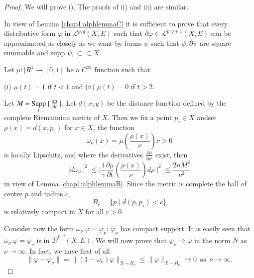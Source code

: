 \begin{proof} 
  We will prove i). The proofs of ii) and iii) are similar. 

  In view of Lemma \ref{chap1:alphlemmaC} it is sufficient to prove
  that every distributive 
  form $\varphi$ in $\mathcal{L}^{p,q}(X,E)$ such that
  ${\overline{\partial}} \varphi \in \mathcal{L}^{p,q+1}(X,E)$ can be
  approximated as closely as we want by forms $\psi$ such that $\psi ,
  {\overline{\partial}} \psi$ are square summable and supp $\psi ,
  \subset \subset X$. 
  
  Let $\mu: \mid R^1 \rightarrow [0,1]$ be a $C^\infty$ function such that 
  
  (i) $\mu (t) = 1$ if $t < 1$ and (ii) $\mu (t) =0$ if $t >2$.
  
  Let $M= {\underset{t}{\operatorname{Supp}}} \mid \frac{d \mu}{d t}\mid$. Let $d(x,y)$
  be the distance function defined by the complete Riemannian metric
  of $X$. Then we fix a point $p_\circ \in X$ 
 and\pageoriginale set $\rho (x) = d (x, p_\circ)$ for $x \in X$, the
 function  
 $$
 \omega_\nu (x) = \mu \left(\frac{\rho (x)}{\nu}\right)\nu
 > 0 
 $$
 is locally Lipschitz, and where the derivatives $\frac{\partial
   \rho}{\partial x^i}$ exist, then  
 $$
 \mid d \omega_\nu \mid^2 \leq \mid \frac{1}{\gamma} \frac{\partial
   \mu}{\partial t} \left(\frac{\rho (x)}{\nu} \right) d
 \rho \mid^2 \leq \frac{2nM^2}{\nu^2}
 $$
 in view of Lemma \ref{chap1:alphlemmaB}. Since the metric is complete
 the ball of centre $p$ 
 and radius $c$, 
 $$
 B_c =\{ p\mid d (p,p_\circ)< c\}
 $$
 is relatively compact in $X$ for all $c > 0$.

Consider now the form $\omega_\nu. \varphi = \varphi_\nu $;
$\varphi_\nu$ has compact support. It is easily seen that
$\omega_\nu. \varphi = \varphi_\nu $ is in $\dot{\mathscr{D}}^{p,q}(X,
E)$. We will now prove that $\varphi_\nu \rightarrow \varphi$ in the
norm $N$ as $\nu \rightarrow \infty$. In fact, we have first of all  
$$
\| \varphi - \varphi_\nu \| = \| (1 - \omega_\nu) \varphi \| _{X-B_
  \nu} \leq \| \varphi \|_ {X-B_\nu} \rightarrow 0  ~~ \text{as} ~~
\nu \rightarrow \infty.
$$


\end{proof}

